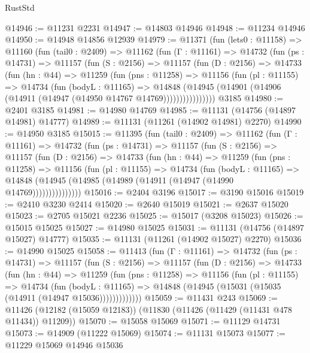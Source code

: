 \begin{lexlean}{RustStd}
\begin{coremodule}
@14946 := @11231 @2231
@14947 := @14803 @14946
@14948 := @11234 @14946
@14950 := @14948 @14856 @12939
@14979 := @11371
    (fun (lets0 : @11158) =>
    @11160
      (fun (tail0 : @2409) =>
      @11162
        (fun (Γ : @11161) =>
        @14732
          (fun (ps : @14731) =>
          @11157
            (fun (S : @2156) =>
            @11157
              (fun (D : @2156) =>
              @14733
                (fun (hn : @44) =>
                @11259
                  (fun (pns : @11258) =>
                  @11156
                    (fun (pl : @11155) =>
                    @14734
                      (fun (bodyL : @11165) =>
                      @14848
                        (@14945
                          (@14901 (@14906 (@14911 (@14947 (@14950 @14767 @14769))))))))))))))))
    @3185
@14980 := @2401 @3185
@14981 := @14980 @14769
@14985 := @11131 (@14756 (@14897 @14981) @14777)
@14989 := @11131 (@11261 (@14902 @14981) @2270)
@14990 := @14950 @3185
@15015 := @11395
    (fun (tail0 : @2409) =>
    @11162
      (fun (Γ : @11161) =>
      @14732
        (fun (ps : @14731) =>
        @11157
          (fun (S : @2156) =>
          @11157
            (fun (D : @2156) =>
            @14733
              (fun (hn : @44) =>
              @11259
                (fun (pns : @11258) =>
                @11156
                  (fun (pl : @11155) =>
                  @14734
                    (fun (bodyL : @11165) =>
                    @14848 (@14945 (@14985 (@14989 (@14911 (@14947 (@14990 @14769)))))))))))))))
@15016 := @2404 @3196
@15017 := @3190 @15016
@15019 := @2410 @3230 @2414
@15020 := @2640 @15019
@15021 := @2637 @15020
@15023 := @2705 @15021 @2236
@15025 := @15017 (@3208 @15023)
@15026 := @15015 @15025
@15027 := @14980 @15025
@15031 := @11131 (@14756 (@14897 @15027) @14777)
@15035 := @11131 (@11261 (@14902 @15027) @2270)
@15036 := @14990 @15025
@15058 := @11413
    (fun (Γ : @11161) =>
    @14732
      (fun (ps : @14731) =>
      @11157
        (fun (S : @2156) =>
        @11157
          (fun (D : @2156) =>
          @14733
            (fun (hn : @44) =>
            @11259
              (fun (pns : @11258) =>
              @11156
                (fun (pl : @11155) =>
                @14734
                  (fun (bodyL : @11165) =>
                  @14848 (@14945 (@15031 (@15035 (@14911 (@14947 @15036)))))))))))))
@15059 := @11431 @243
@15069 := @11426 (@12182 (@15059 @12183)) (@11830 (@11426 (@11429 (@11431 @478 @11434)) @11209))
@15070 := @15058 @15069
@15071 := @11129 @14731
@15073 := @14909 (@11222 @15069)
@15074 := @11131 @15073
@15077 := @11229 @15069 @14946 @15036

\end{coremodule}
\end{lexlean}
